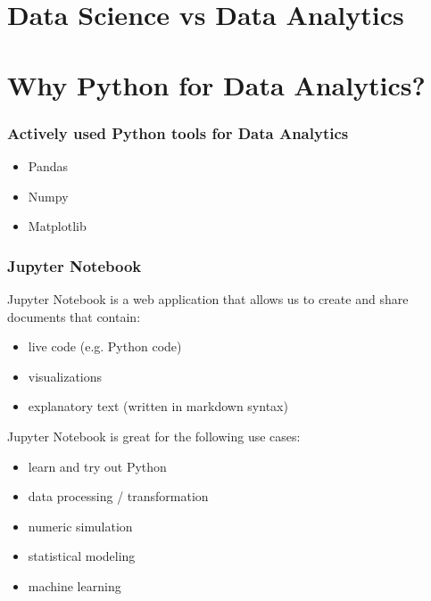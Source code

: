 \documentclass[11pt]{article}
\providecommand{\tightlist}{%
      \setlength{\itemsep}{0pt}\setlength{\parskip}{0pt}}
\begin{document}
\section{Data Science vs Data
Analytics}\label{data-science-vs-data-analytics}

\section{Why Python for Data
Analytics?}\label{why-python-for-data-analytics}

\subsubsection{Actively used Python tools for Data
Analytics}\label{actively-used-python-tools-for-data-analytics}

\begin{itemize}
\tightlist
\item
  Pandas
\item
  Numpy
\item
  Matplotlib
\end{itemize}

\subsubsection{Jupyter Notebook}\label{jupyter-notebook}

Jupyter Notebook is a web application that allows us to create and share
documents that contain:

\begin{itemize}
\tightlist
\item
  live code (e.g. Python code)
\item
  visualizations
\item
  explanatory text (written in markdown syntax)
\end{itemize}

Jupyter Notebook is great for the following use cases:

\begin{itemize}
\tightlist
\item
  learn and try out Python
\item
  data processing / transformation
\item
  numeric simulation
\item
  statistical modeling
\item
  machine learning
\end{itemize}
\end{document}

